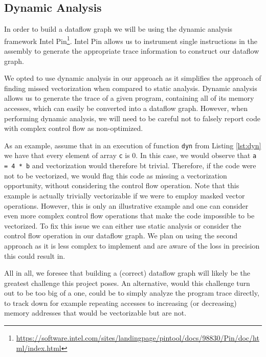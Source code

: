 \documentclass[acmsmall,review, nonacm]{acmart}
\begin{document}
\subsection{Dynamic Analysis}
In order to build a dataflow graph we will be using the dynamic analysis framework 
Intel Pin\footnote{\url{https://software.intel.com/sites/landingpage/pintool/docs/98830/Pin/doc/html/index.html}}.
Intel Pin allows us to instrument single instructions in the assembly to generate 
the appropriate trace information to construct our dataflow graph. 

We opted to use dynamic analysis in our approach as it simplifies the approach of finding missed vectorization when 
compared to static analysis. Dynamic analysis allows us to generate the trace of a given program, containing all of its memory
accesses, which can easily be converted into a dataflow graph.
However, when performing dynamic analysis, we will need to be careful not to falsely report code with 
complex control flow as non-optimized.

As an example, assume that in an execution of function \texttt{dyn} from Listing \ref{lst:dyn} 
we have that every element of array \texttt{c} is 0. In this case, we would 
observe that \texttt{a = 4 * b} and vectorization would therefore bt trivial.
Therefore, if the code were not to be vectorized, we would flag this code as missing a vectorization opportunity, 
without considering the control flow operation.
Note that this example is actually trivially vectorizable if we were to employ masked 
vector operations. However, this is only an illustrative example and one can consider even more complex control 
flow operations that make the code impossible to be vectorized. 
To fix this issue we can either use static analysis or consider the control flow operation in our dataflow graph.
We plan on using the second approach as it is less complex to implement and are aware of the loss in precision this could result in.


All in all, we foresee that building a (correct) dataflow graph will likely be the greatest challenge this project poses. An alternative,
would this challenge turn out to be too big of a one, could be to simply analyze the program trace directly, to track down for example repeating accesses
to increasing (or decreasing) memory addresses that would be vectorizable but are not.
\end{document}
